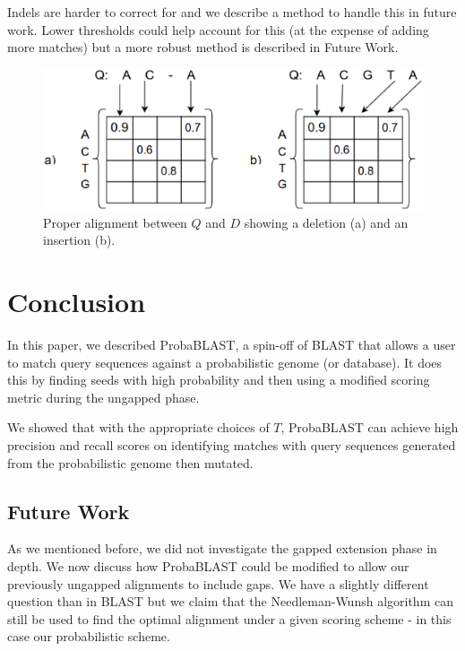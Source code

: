 \documentclass[11pt]{IEEEtran}
\begin{document}
Indels are harder to correct for and we describe a method to handle this in future work. Lower thresholds could help account for this (at the expense of adding more matches) but a more robust method is described in Future Work. 

\begin{figure}
    \centering
    \includegraphics[scale=0.25]{indel}
    \caption{Proper alignment between $Q$ and $D$ showing a deletion (a) and an insertion (b).}
    \label{indel}
\end{figure}

\section{Conclusion}
In this paper, we described ProbaBLAST, a spin-off of BLAST that allows a user to match query sequences against a probabilistic genome (or database). It does this by finding seeds with high probability and then using a modified scoring metric during the ungapped phase. 

We showed that with the appropriate choices of $T$, ProbaBLAST can achieve high precision and recall scores on identifying matches with query sequences generated from the probabilistic genome then mutated.

\subsection{Future Work}

As we mentioned before, we did not investigate the gapped extension phase in depth. We now discuss how ProbaBLAST could be modified to allow our previously ungapped alignments to include gaps. We have a slightly different question than in BLAST but we claim that the Needleman-Wunsh algorithm can still be used to find the optimal alignment under a given scoring scheme - in this case our probabilistic scheme.
\end{document}
